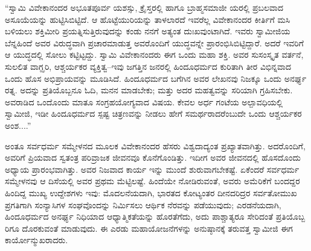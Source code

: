 “ಸ್ವಾಮಿ ವಿವೇಕಾನಂದರ ಅಭೂತಪೂರ್ವ ಯಶಸ್ಸು, ಕ್ರೈಸ್ತರಲ್ಲಿ ಹಾಗೂ ಬ್ರಾಹ್ಮಸಮಾಜೀ ಯರಲ್ಲಿ ಪ್ರಬಲವಾದ ಅಸೂಯೆಯನ್ನು ಹುಟ್ಟಿಸಿಬಿಟ್ಟಿದೆ. ಆ ಹೊಟ್ಟೆಯುರಿಯನ್ನು ತಾಳಲಾರದೆ ಇವರೆಲ್ಲ ವಿವೇಕಾನಂದರ ಕೀರ್ತಿಗೆ ಮಸಿ ಬಳಿಯಲು ಶಕ್ತಿಮೀರಿ ಪ್ರಯತ್ನಿಸುತ್ತಿರುವುದನ್ನು ಕಂಡು ನನಗೆ ಅತ್ಯಂತ ದುಃಖವುಂಟಾಗಿದೆ. ಇವರು ಸ್ವಾಮೀಜಿಯ ಬೆನ್ನಹಿಂದೆ ಅವರ ವಿರುದ್ಧವಾಗಿ ಪ್ರಚಾರಮಾಡುತ್ತ ಅವರೊಂದಿಗೆ ಯುದ್ಧವನ್ನೇ ಪ್ರಾರಂಭಿಸಿಬಿಟ್ಟಿದ್ದಾರೆ. ಅದರೆ ಇವರಿಗೆ ಆ ಯುದ್ಧದಲ್ಲಿ ಸೋಲು ಕಟ್ಟಿಟ್ಟದ್ದು. ಸ್ವಾಮಿ ವಿವೇಕಾನಂದರು ಈಗ ಒಂದು ಮಹಾ ಶಕ್ತಿ. ಅವರ ಸುಸಂಸ್ಕೃತ ವರ್ತನೆ, ಸುಲಲಿತ ವಾಗ್ಝರಿ, ಆಶ್ಚರ್ಯಕರ ವ್ಯಕ್ತಿತ್ವ–ಇವು ಜಗತ್ತಿನ ಜನರಲ್ಲಿ ಹಿಂದೂಧರ್ಮದ ಕುರಿತಾಗಿ ತೀರ ವಿಭಿನ್ನವಾದ ಒಂದು ಹೊಸ ಅಭಿಪ್ರಾಯವನ್ನು ಮೂಡಿಸಿದೆ. ಹಿಂದೂಧರ್ಮದ ಬಗೆಗಿನ ಅವರ ಲೇಖನವು ನಿಜಕ್ಕೂ ಒಂದು ಅನರ್ಘ್ಯ ರತ್ನ. ಅದನ್ನು ಪ್ರತಿಯೊಬ್ಬನೂ ಓದಿ, ಮನನ ಮಾಡಬೇಕು; ಮತ್ತು ಅದರ ಮಹತ್ವವನ್ನು ಸರಿಯಾಗಿ ಗ್ರಹಿಸಬೇಕು. ಅವರಾಡಿದ ಒಂದೊಂದು ಮಾತೂ ಸಂಗ್ರಹಯೋಗ್ಯವಾದ ವಿಷಯ. ಕೇವಲ ಅರ್ಧ ಗಂಟೆಯ ಅಲ್ಪಾವಧಿಯಲ್ಲಿ ಸ್ವಾಮೀಜಿ, ಇಡೀ ಹಿಂದೂಧರ್ಮದ ಸ್ಪಷ್ಟ ಚಿತ್ರಣವನ್ನು ನೀಡಲು ಹೇಗೆ ಸಮರ್ಥರಾದರೆಂಬುದೇ ಒಂದು ಆಶ್ಚರ್ಯಕರ ಅಂಶ....”

ಅಂತೂ ಸರ್ವಧರ್ಮ ಸಮ್ಮೇಳನದ ಮೂಲಕ ವಿವೇಕಾನಂದರ ಹೆಸರು ವಿಶ್ವದಾದ್ಯಂತ ಪ್ರಖ್ಯಾತವಾಗಿತ್ತು. ಅದರೊಂದಿಗೆ, ಅವರಿಗೆ ಪ್ರಿಯವಾದ ಸ್ವತಂತ್ರ ಪರಿವ್ರಾಜಕ ಜೀವನವೂ ಕೊನೆಗೊಂಡಿತ್ತು. ಇದೀಗ ಅವರ ಜೀವನದಲ್ಲಿ ಹೊಸದೊಂದು ಅಧ್ಯಾಯ ಪ್ರಾರಂಭವಾಗಿತ್ತು. ಅವರ ನಿಜವಾದ ಕಾರ್ಯ ಇನ್ನು ಮುಂದೆ ಶುರುವಾಗಬೇಕಷ್ಟೆ. ಏಕೆಂದರೆ ಸರ್ವಧರ್ಮ ಸಮ್ಮೇಳನವು ಆ ದಿಸೆಯಲ್ಲಿ ಅವರ ಪ್ರಥಮ ಮೆಟ್ಟಿಲಷ್ಟೆ. ಹಿಂದೆಯೇ ನೋಡಿರುವಂತೆ, ಅವರು ಅಮೆರಿಕೆಗೆ ಬಂದದ್ದರ ಹಿಂದಿದ್ದ ಮುಖ್ಯ ಉದ್ದೇಶಗಳು ಇವು: ಮೊದಲನೆಯದಾಗಿ, ಭಾರತದ ಕೋಟ್ಯಂತರ ದೀನದರಿದ್ರರ ಸರ್ವತೋಮುಖ ಪ್ರಗತಿಗಾಗಿ ಸಂನ್ಯಾಸಿಗಳ ಸಂಘವೊಂದನ್ನು ನಿರ್ಮಿಸಲು ಆರ್ಥಿಕ ನೆರವನ್ನು ಪಡೆಯುವುದು; ಎರಡನೆಯದಾಗಿ, ಹಿಂದೂಧರ್ಮದ ಅನರ್ಘ್ಯ ನಿಧಿಯಾದ ಆಧ್ಯಾತ್ಮಿಕತೆಯನ್ನು ಹೊರತೆಗೆದು, ಅದು ಪಾಶ್ಚಾತ್ಯರೂ ಸೇರಿದಂತೆ ಪ್ರತಿಯೊಬ್ಬ ರಿಗೂ ದೊರಕುವಂತೆ ಮಾಡುವುದು. ಈ ಎರಡು ಮಹಾಯೋಜನೆಗಳನ್ನು ಅನುಷ್ಠಾನಕ್ಕೆ ತರುವತ್ತ ಸ್ವಾಮೀಜಿ ಈಗ ಕಾರ್ಯೋನ್ಮುಖರಾದರು.

